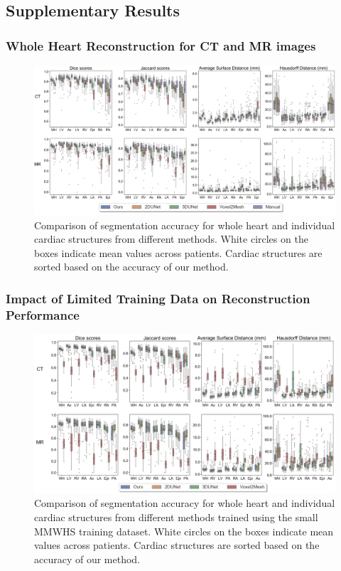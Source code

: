 \documentclass[times,review,preprint,authoryear]{elsarticle}
\begin{document}
\subsection{Supplementary Results}
\subsubsection{Whole Heart Reconstruction for CT and MR images}
\begin{figure}[H]
\centering
\includegraphics[width=\textwidth]{boxplot_large2.png}
\caption{Comparison of segmentation accuracy for whole heart and individual cardiac structures from different methods. White circles on the boxes indicate mean values across patients. Cardiac structures are sorted based on the accuracy of our method. } 
\label{figure:boxplot-large}
\end{figure}

\subsubsection{Impact of Limited Training Data on Reconstruction Performance}
\begin{figure}[H]
\centering
\includegraphics[width=\textwidth]{boxplot_small.png}
\caption{Comparison of segmentation accuracy for whole heart and individual cardiac structures from different methods trained using the small MMWHS training dataset. White circles on the boxes indicate mean values across patients. Cardiac structures are sorted based on the accuracy of our method. } 
\label{figure:boxplot-small}
\end{figure}
\end{document}
